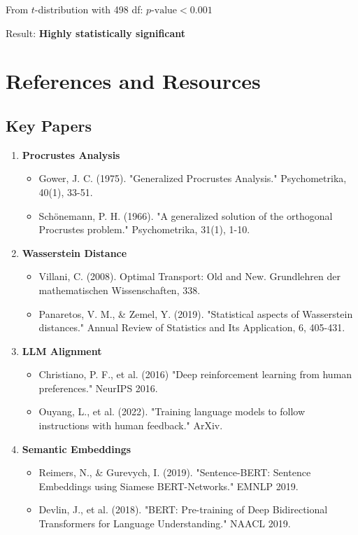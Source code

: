 \documentclass[12pt,a4paper,oneside]{report}
\begin{document}
From $t$-distribution with 498 df: $p \text{-value} < 0.001$

Result: \textbf{Highly statistically significant}

\clearpage
\chapter{References and Resources}

\section{Key Papers}

\begin{enumerate}
    \item \textbf{Procrustes Analysis}
    \begin{itemize}
        \item Gower, J. C. (1975). "Generalized Procrustes Analysis." Psychometrika, 40(1), 33-51.
        \item Schönemann, P. H. (1966). "A generalized solution of the orthogonal Procrustes problem." Psychometrika, 31(1), 1-10.
    \end{itemize}

    \item \textbf{Wasserstein Distance}
    \begin{itemize}
        \item Villani, C. (2008). Optimal Transport: Old and New. Grundlehren der mathematischen Wissenschaften, 338.
        \item Panaretos, V. M., \& Zemel, Y. (2019). "Statistical aspects of Wasserstein distances." Annual Review of Statistics and Its Application, 6, 405-431.
    \end{itemize}

    \item \textbf{LLM Alignment}
    \begin{itemize}
        \item Christiano, P. F., et al. (2016) "Deep reinforcement learning from human preferences." NeurIPS 2016.
        \item Ouyang, L., et al. (2022). "Training language models to follow instructions with human feedback." ArXiv.
    \end{itemize}

    \item \textbf{Semantic Embeddings}
    \begin{itemize}
        \item Reimers, N., \& Gurevych, I. (2019). "Sentence-BERT: Sentence Embeddings using Siamese BERT-Networks." EMNLP 2019.
        \item Devlin, J., et al. (2018). "BERT: Pre-training of Deep Bidirectional Transformers for Language Understanding." NAACL 2019.
    \end{itemize}
\end{enumerate}
\end{document}
